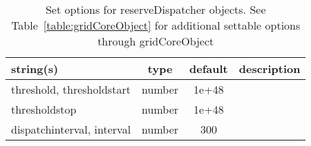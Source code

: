 \begin{table}[ht]
\centering
\begin{tabular}{p{5cm} c c p{7cm}}
\hline
string(s) & type & default & description \\
\hline
threshold, thresholdstart & number & 1e+48 & \\
thresholdstop & number & 1e+48 & \\
dispatchinterval, interval & number & 300 & \\
\hline
\end{tabular}
\caption{Set options for reserveDispatcher objects. See Table~\ref{table:gridCoreObject} for additional settable options through gridCoreObject}
\label{table:reserveDispatcher}
\end{table}

